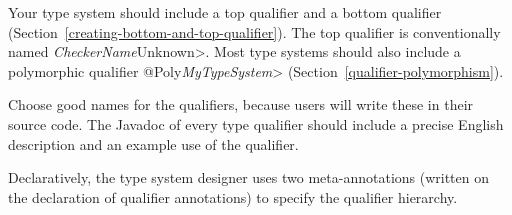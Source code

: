 
Your type system should include a top qualifier and a bottom qualifier
(Section~\ref{creating-bottom-and-top-qualifier}).
The top qualifier is conventionally named \<\emph{CheckerName}Unknown>.
Most type systems should also include a
polymorphic qualifier \<@Poly\emph{MyTypeSystem}>
(Section~\ref{qualifier-polymorphism}).

Choose good names for the qualifiers, because users will write these in
their source code.
The Javadoc of every type qualifier should include a precise English
description and an example use of the qualifier.



Declaratively, the type system designer uses two meta-annotations (written
on the declaration of qualifier annotations) to specify the qualifier
hierarchy.

